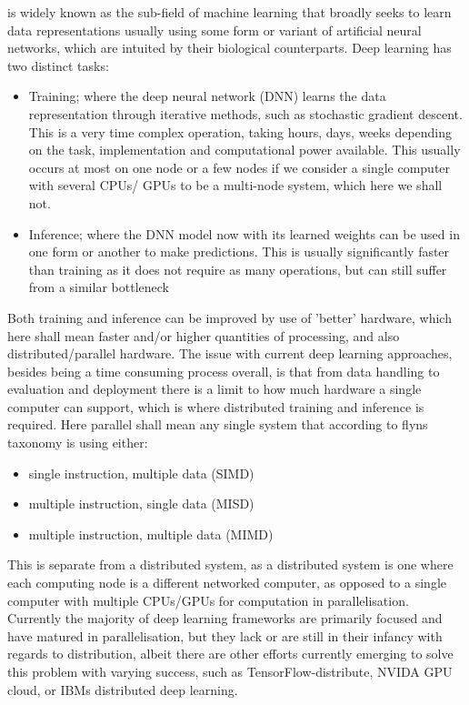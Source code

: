 
 is widely known as the sub-field of machine learning that broadly seeks to learn data representations usually using some form or variant of artificial neural networks, which are intuited by their biological counterparts. Deep learning has two distinct tasks:
\begin{itemize}
    \item Training; where the deep neural network (DNN) learns the data representation through iterative methods, such as stochastic gradient descent. This is a very time complex operation, taking hours, days, weeks depending on the task, implementation and computational power available. This usually occurs at most on one node or a few nodes if we consider a single computer with several CPUs/ GPUs to be a multi-node system, which here we shall not.
    \item Inference; where the DNN model now with its learned weights can be used in one form or another to make predictions. This is usually significantly faster than training as it does not require as many operations, but can still suffer from a similar bottleneck \cite{panda2019high}
\end{itemize}

Both training and inference can be improved by use of 'better' hardware, which here shall mean faster and/or higher quantities of processing, and also distributed/parallel hardware. The issue with current deep learning approaches, besides being a time consuming process overall, is that from data handling to evaluation and deployment there is a limit to how much hardware a single computer can support, which is where distributed training and inference is required. Here parallel shall mean any single system that according to flyns taxonomy is using either:
\begin{itemize}
    \item single instruction, multiple data (SIMD)
    \item multiple instruction, single data (MISD)
    \item multiple instruction, multiple data (MIMD)
\end{itemize}
This is separate from a distributed system, as a distributed system is one where each computing node is a different networked computer, as opposed to a single computer with multiple CPUs/GPUs for computation in parallelisation. Currently the majority of deep learning frameworks are primarily focused and have matured in parallelisation, but they lack or are still in their infancy with regards to distribution, albeit there are other efforts currently emerging to solve this problem with varying success, such as TensorFlow-distribute, NVIDA GPU cloud, or IBMs distributed deep learning. \cite{panda2019high}


